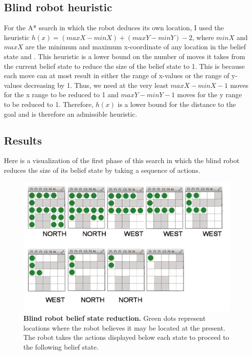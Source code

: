 \documentclass{article}
\begin{document}
\subsection{Blind robot heuristic}

For the A* search in which the robot deduces its own location, I used the heuristic $h(x) = (maxX - minX) + (maxY - minY) - 2$, where $minX$ and $maxX$ are the minimum and maximum x-coordinate of any location in the belief state and . This heuristic is a lower bound on the number of moves it takes from the current belief state to reduce the size of the belief state to 1. This is because each move can at most result in either the range of x-values or the range of y-values decreasing by 1. Thus, we need at the very least $maxX - minX - 1$ moves for the x range to be reduced to 1 and $maxY - minY - 1$ moves for the y range to be reduced to 1. Therefore, $h(x)$ is a lower bound for the distance to the goal and is therefore an admissible heuristic.

\subsection{Results}

Here is a visualization of the first phase of this search in which the blind robot reduces the size of its belief state by taking a sequence of actions.

\begin{figure}[!htb]
\centering
\includegraphics[scale=1]{blindrobot.pdf}
\caption{{\bf Blind robot belief state reduction.} Green dots represent locations where the robot believes it may be located at the present. The robot takes the actions displayed below each state to proceed to the following belief state.}
\end{figure}
\end{document}
